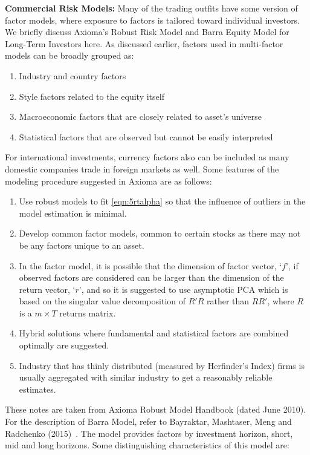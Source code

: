 \noindent\textbf{Commercial Risk Models:} Many of the trading outfits have some version of factor models, where exposure to factors is tailored toward individual investors. We briefly discuss Axioma's Robust Risk Model and Barra Equity Model for Long-Term Investors here. As discussed earlier, factors used in multi-factor models can be broadly grouped as:


\begin{enumerate}[--]
\item Industry and country factors
\item Style factors related to the equity itself
\item Macroeconomic factors that are closely related to asset's universe
\item Statistical factors that are observed but cannot be easily interpreted
\end{enumerate}


For international investments, currency factors also can be included as many domestic companies trade in foreign markets as well. Some features of the modeling procedure suggested in Axioma are as follows:


\begin{enumerate}[--]
\item Use robust models to fit \eqref{eqn:5rtalpha} so that the influence of outliers in the model estimation is minimal.
\item Develop common factor models, common to certain stocks as there may not be any factors unique to an asset.
\item In the factor model, it is possible that the dimension of factor vector, `$f$', if observed factors are considered can be larger than the dimension of the return vector, `$r$', and so it is suggested to use asymptotic PCA which is based on the singular value decomposition of $R'R$ rather than $RR'$, where $R$ is a $m \times T$ returns matrix.
\item Hybrid solutions where fundamental and statistical factors are combined optimally are suggested. 
\item Industry that has thinly distributed (measured by Herfinder's Index) firms is usually aggregated with similar industry to get a reasonably reliable estimates.
\end{enumerate}


These notes are taken from Axioma Robust Model Handbook (dated June 2010). For the description of Barra Model, refer to Bayraktar, Mashtaser, Meng and Radchenko (2015)~\cite{baymasmenrad15}. The model provides factors by investment horizon, short, mid and long horizons. Some distinguishing characteristics of this model are:


